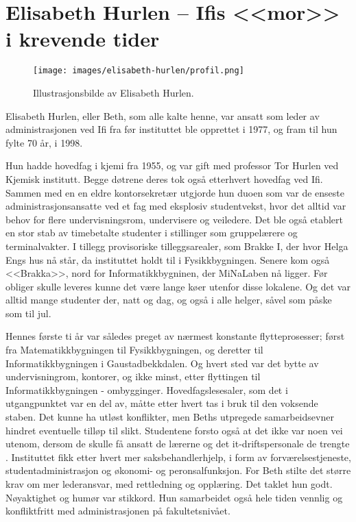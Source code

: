\chapter[Elisabeth Hurlen]{Elisabeth Hurlen -- Ifis <<mor>> i krevende tider}

\author{Skrevet av Narve Trædal}

\begin{wrapfigure}{l}{6.5cm}
	\centering
	\texttt{[image: images/elisabeth-hurlen/profil.png]}
	\label{fig:elisabeth-hurlen}
	\caption{Illustrasjonsbilde av Elisabeth Hurlen.}
\end{wrapfigure}

Elisabeth Hurlen, eller Beth, som alle kalte henne, var ansatt som leder av administrasjonen ved Ifi fra før instituttet ble opprettet i 1977, og fram til hun fylte 70 år, i 1998.

Hun hadde hovedfag i kjemi fra 1955, og var gift med professor Tor Hurlen ved Kjemisk institutt. Begge døtrene deres tok også etterhvert hovedfag ved Ifi. Sammen med en en eldre kontorsekretær utgjorde hun duoen som var de enseste administrasjonsansatte ved et fag med eksplosiv studentvekst, hvor det alltid var behov for flere undervisningsrom, undervisere og veiledere. Det ble også etablert en stor stab av timebetalte studenter i stillinger som gruppelærere og terminalvakter. I tillegg provisoriske tilleggsarealer, som Brakke I, der hvor Helga Engs hus nå står, da instituttet holdt til i Fysikkbygningen. Senere kom også <<Brakka>>, nord for Informatikkbygninen, der MiNaLaben nå ligger. Før obliger skulle leveres kunne det være lange køer utenfor disse lokalene. Og det var alltid mange studenter der, natt og dag, og også i alle helger, såvel som påske som til jul.

Hennes første ti år var således preget av nærmest konstante flytteprosesser; først fra Matematikkbygningen til Fysikkbygningen, og deretter til Informatikkbygningen i Gaustadbekkdalen. Og hvert sted var det bytte av undervisningrom, kontorer, og ikke minst, etter flyttingen til Informatikkbygningen - ombygginger. Hovedfagslesesaler, som det i utgangpunktet var en del av, måtte etter hvert tas i bruk til den voksende staben. Det kunne ha utløst konflikter, men Beths utpregede samarbeidsevner hindret eventuelle tilløp til slikt. Studentene forsto også at det ikke var noen vei utenom, dersom de skulle få ansatt de lærerne og det it-driftspersonale de trengte . Instituttet fikk etter hvert mer saksbehandlerhjelp, i form av forværelsestjeneste, studentadministrasjon og økonomi- og peronsalfunksjon. For Beth stilte det større krav om mer lederansvar, med rettledning og opplæring. Det taklet hun godt. Nøyaktighet og humør var stikkord. Hun samarbeidet også hele tiden vennlig og konfliktfritt med administrasjonen på fakultetsnivået.

